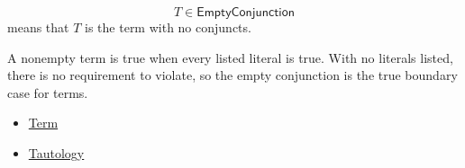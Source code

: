 \begin{remark*}
\[
T\in\mathsf{EmptyConjunction}
\]
means that \(T\) is the term with no conjuncts.
\end{remark*}

\begin{remark*}[Interpretation]
A nonempty term is true when every listed literal is true. With no literals
listed, there is no requirement to violate, so the empty conjunction is the true
boundary case for terms.
\end{remark*}

\begin{dependencies}
\begin{itemize}
  \item \hyperref[def:term-propositional-logic]{Term}
  \item \hyperref[def:tautology-propositional-logic]{Tautology}
\end{itemize}
\end{dependencies}
